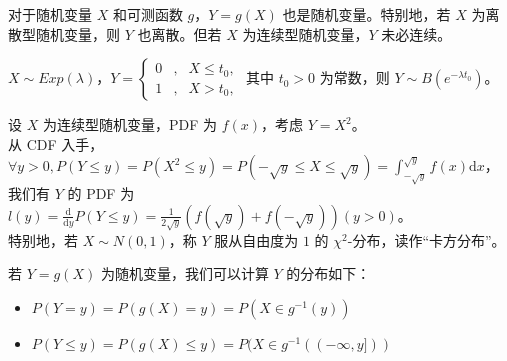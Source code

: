 \documentclass[../main.tex]{subfiles}
\begin{document}
对于随机变量 $X$ 和可测函数 $g$，$Y=g(X)$ 也是随机变量。特别地，若 $X$ 为离散型随机变量，则 $Y$ 也离散。但若 $X$ 为连续型随机变量，$Y$ 未必连续。

\begin{example}
$X\sim Exp(\lambda)$，$Y=\left\{
\begin{aligned}
0 & , & X\leq t_0,\\
1 & , & X>t_0,
\end{aligned}
\right.$ 其中 $t_0>0$ 为常数，则 $Y\sim B(e^{-\lambda t_0})$。
\end{example}

\begin{example}
设 $X$ 为连续型随机变量，PDF 为 $f(x)$，考虑 $Y=X^2$。\\
从 CDF 入手，$\forall y>0,P(Y\leq y)=P(X^2\leq y)=P(-\sqrt{y}\leq X\leq \sqrt{y})=\int_{-\sqrt{y}}^{\sqrt{y}}f(x)\mathrm{d}x$，我们有 $Y$ 的 PDF 为 $l(y)=\frac{\mathrm{d}}{\mathrm{d}y}P(Y\leq y)=\frac{1}{2\sqrt{y}}(f(\sqrt{y})+f(-\sqrt{y}))(y>0)$。\\
特别地，若 $X\sim N(0,1)$，称 $Y$ 服从自由度为 $1$ 的 $\chi^2$-分布，读作“卡方分布”。
\end{example}

若 $Y=g(X)$ 为随机变量，我们可以计算 $Y$ 的分布如下：
\begin{itemize}
    \item $P(Y=y)=P(g(X)=y)=P(X\in g^{-1}(y))$
    \item $P(Y\leq y)=P(g(X)\leq y)=P(X\in g^{-1}((-\infty,y]))$
\end{itemize}
\end{document}
